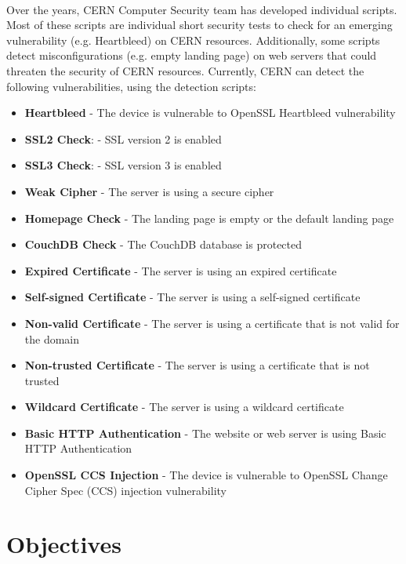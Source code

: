 \paragraph{}
Over the years, CERN Computer Security team has developed individual scripts. Most of these scripts are individual short security tests to check for an emerging vulnerability (e.g. Heartbleed) on CERN resources. Additionally, some scripts detect misconfigurations (e.g. empty landing page) on web servers that could threaten the security of CERN resources. Currently, CERN can detect the following vulnerabilities, using the detection scripts:
\begin{itemize}
\item \textbf{Heartbleed} - The device is vulnerable to OpenSSL Heartbleed vulnerability
\item \textbf{SSL2 Check}: - SSL version 2 is enabled
\item \textbf{SSL3 Check}: - SSL version 3 is enabled
\item \textbf{Weak Cipher} - The server is using a secure cipher
\item \textbf{Homepage Check} - The landing page is empty or the default landing page
\item \textbf{CouchDB Check} - The CouchDB database is protected
\item \textbf{Expired Certificate} - The server is using an expired certificate
\item \textbf{Self-signed Certificate} - The server is using a self-signed certificate
\item \textbf{Non-valid Certificate} - The server is using a certificate that is not valid for the domain
\item \textbf{Non-trusted Certificate} - The server is using a certificate that is not trusted
\item \textbf{Wildcard Certificate} - The server is using a wildcard certificate
\item \textbf{Basic HTTP Authentication} - The website or web server is using Basic HTTP Authentication
\item \textbf{OpenSSL CCS Injection} - The device is vulnerable to OpenSSL Change Cipher Spec (CCS) injection vulnerability

\end{itemize}



\section{Objectives}
